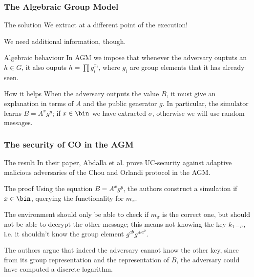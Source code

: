 \documentclass{beamer}
\begin{document}
    \begin{frame}
        \frametitle{The Algebraic Group Model}
        
        \begin{exampleblock}{The solution}
            We extract at a different point of the execution!
            
            We need additional information, though.
        \end{exampleblock}
    
        \begin{block}{Algebraic behaviour}
            In AGM we impose that whenever the adversary ouptuts an $h\in G$, it also ouputs $h=\prod g_i^{x_i}$, where $g_i$ are group elements that it has already seen.
        \end{block}
    
        \begin{block}{How it helps}
            When the adversary outputs the value $B$, it must give an explanation in terms of $A$ and the public generator $g$. In particular, the simulator learns $B=A^xg^y$; if $x\in\bin$ we have extracted $\sigma$, otherwise we will use random messages.
        \end{block}
    \end{frame}

    \begin{frame}
        \frametitle{The security of CO in the AGM}
        
        \begin{block}{The result}
            In their paper, Abdalla et al. prove UC-security against adaptive malicious adversaries of the Chou and Orlandi protocol in the AGM.
        \end{block}
    
        \begin{block}{The proof}
            Using the equation $B=A^xg^y$, the authors construct a simulation if $x\in\bin$, querying the functionality for $m_x$.
            
            The environment should only be able to check if $m_\sigma$ is the correct one, but should not be able to decrypt the other message; this means not knowing the key $k_{1-\sigma}$, i.e. it shouldn't know the group element $g^{ab}g^{\pm a^2}$.
            
            The authors argue that indeed the adversary cannot know the other key, since from its group representation and the representation of $B$, the adversary could have computed a discrete logarithm.
        \end{block}
    \end{frame}
\end{document}
